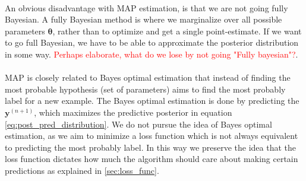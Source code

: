 \\
An obvious disadvantage with MAP estimation, is that we are not going fully Bayesian. A fully Bayesian method is where we marginalize over all possible parameters $\boldsymbol{\theta}$, rather than to optimize and get a single point-estimate. If we want to go full Bayesian, we have to be able to approximate the posterior distribution in some way. \textcolor{red}{Perhaps elaborate, what do we lose by not going "Fully bayesian"?}. \\
\\
MAP is closely related to Bayes optimal estimation that instead of finding the most probable hypothesis (set of parameters) aims to find the most probably label for a new example. The Bayes optimal estimation is done by predicting the $\boldsymbol{y}^{(n+1)}$, which maximizes the predictive posterior in equation \ref{eq:post_pred_distribution}. We do not pursue the idea of Bayes optimal estimation, as we aim to minimize a loss function which is not always equivalent to predicting the most probably label. In this way we preserve the idea that the loss function dictates how much the algorithm should care about making certain predictions as explained in \ref{sec:loss_func}.

